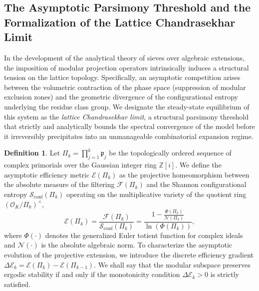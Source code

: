 \documentclass{article}
\numberwithin{equation}{section}
\theoremstyle{plain}
\theoremstyle{definition}
\newtheorem{definition}[theorem]{Definition}
\begin{document}
\subsection{The Asymptotic Parsimony Threshold and the Formalization of the Lattice Chandrasekhar Limit}

In the development of the analytical theory of sieves over algebraic extensions, the imposition of modular projection operators intrinsically induces a structural tension on the lattice topology. Specifically, an asymptotic competition arises between the volumetric contraction of the phase space (suppression of modular exclusion zones) and the geometric divergence of the configurational entropy underlying the residue class group.
We designate the steady-state equilibrium of this system as the \textit{lattice Chandrasekhar limit}, a structural parsimony threshold that strictly and analytically bounds the spectral convergence of the model before it irreversibly precipitates into an unmanageable combinatorial expansion regime.

\begin{definition}
Let $\Pi_k = \prod_{j=1}^k \mathfrak{p}_j$ be the topologically ordered sequence of complex primorials over the Gaussian integer ring $\mathbb{Z}[i]$. We define the asymptotic efficiency metric $\mathcal{E}(\Pi_k)$ as the projective homeomorphism between the absolute measure of the filtering $\mathcal{F}(\Pi_k)$ and the Shannon configurational entropy $\mathcal{S}_{\mathrm{conf}}(\Pi_k)$ operating on the multiplicative variety of the quotient ring $(\mathcal{O}_K/\Pi_k)^\times$,
\begin{equation}
    \mathcal{E}(\Pi_k) = \frac{\mathcal{F}(\Pi_k)}{\mathcal{S}_{\mathrm{conf}}(\Pi_k)} = \frac{1 - \frac{\Phi(\Pi_k)}{\mathcal{N}(\Pi_k)}}{\ln(\Phi(\Pi_k))},
\end{equation}
where $\Phi(\cdot)$ denotes the generalized Euler totient function for complex ideals and $\mathcal{N}(\cdot)$ is the absolute algebraic norm.
To characterize the asymptotic evolution of the projective extension, we introduce the discrete efficiency gradient $\Delta \mathcal{E}_k = \mathcal{E}(\Pi_{k}) - \mathcal{E}(\Pi_{k-1})$. We shall say that the modular subspace preserves ergodic stability if and only if the monotonicity condition $\Delta \mathcal{E}_k > 0$ is strictly satisfied.
\end{definition}
\end{document}
